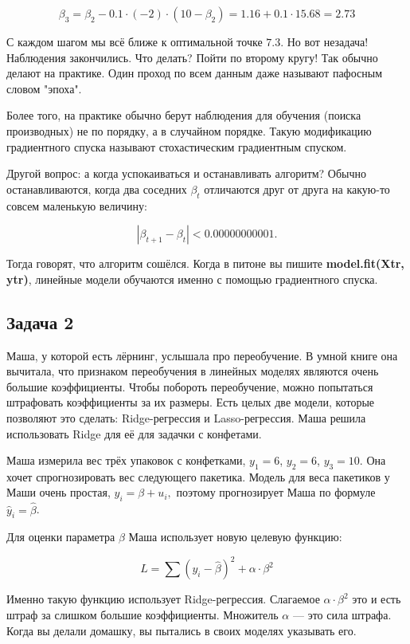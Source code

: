 \documentclass[12pt, a4paper, oneside]{article}
\begin{document}
{\begin{enumerate}
	$$
	\beta_3 = \beta_2 - 0.1 \cdot (-2) \cdot (10 - \beta_2) = 1.16 + 0.1 \cdot 15.68 = 2.73
	$$
	
	С каждом шагом мы всё ближе к оптимальной точке $7.3$.  Но вот незадача! Наблюдения закончились. Что делать?  Пойти по второму кругу! Так обычно делают на практике. Один проход по всем данным даже называют пафосным словом "эпоха". 
	
	Более того, на практике обычно берут наблюдения для обучения (поиска производных) не по порядку, а в случайном порядке. Такую модификацию градиентного спуска называют стохастическим градиентным спуском. 
	
	Другой вопрос: а когда успокаиваться и останавливать алгоритм? Обычно останавливаются, когда два соседних $\beta_t$ отличаются друг от друга на какую-то совсем маленькую величину:
	
	$$
	|\beta_{t+1}  - \beta_t|  < 0.00000000001.
	$$
	
	Тогда говорят, что алгоритм сошёлся. Когда в питоне вы пишите \textbf{model.fit(Xtr, ytr)}, линейные модели обучаются именно с помощью градиентного спуска. 
\end{enumerate}
}


\subsection*{Задача 2}

Маша, у которой есть лёрнинг,  услышала про переобучение. В умной книге она вычитала, что признаком переобучения в линейных моделях являются очень большие коэффициенты. Чтобы побороть переобучение, можно попытаться штрафовать коэффициенты за их размеры. Есть целых две модели, которые позволяют это сделать:  Ridge-регрессия и Lasso-регрессия. Маша решила использовать Ridge для  её для задачки с конфетами.  

Маша измерила вес трёх упаковок с конфетками,  $y_1=6$, $y_2=6$, $y_3=10$.  Она хочет спрогнозировать вес следующего пакетика. Модель для веса пакетиков у Маши очень простая,  $y_i = \beta + u_i, $ поэтому прогнозирует Маша по формуле $\hat y_i = \hat \beta$.

Для оценки параметра $\beta$ Маша использует новую целевую функцию:

\[
L = \sum (y_i - \hat \beta)^2  + \alpha \cdot \beta^2
\]

Именно такую функцию использует Ridge-регрессия. Слагаемое $\alpha \cdot \beta^2$ это и есть штраф за слишком большие коэффициенты.  Множитель $\alpha$ --- это сила штрафа. Когда вы делали домашку, вы пытались в своих моделях указывать его. 
\end{document}
